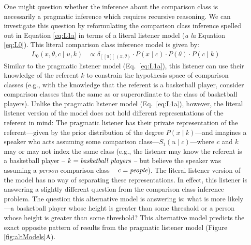 \documentclass[doc]{apa6}
\begin{document}
One might question whether the inference about the comparison class is necessarily a pragmatic inference which requires recursive reasoning. 
We can investigate this question by reformulating the comparison class inference  spelled out in Equation \ref{eq:L1a} in terms of a literal listener model (\emph{a la} Equation \ref{eq:L0}). 
This literal comparison class inference model is given by:
%
  \begin{align}
L_{0}(x, \theta, c \mid u, k) &\propto \delta_{[\![u]\!](x, \theta)} \cdot P(x \mid c)\cdot P(\theta) \cdot P(c \mid k)  \label{eq:L0alt}
\end{align}
%
Similar to the pragmatic listener model (Eq.~\ref{eq:L1a}), this listener can use their knowledge of the referent $k$ to constrain the hypothesis space of comparison classes (e.g., with the knowledge that the referent is a basketball player, consider comparison classes that the same as or superordinate to the class of basketball players).
Unlike the pragmatic listener model (Eq.~\ref{eq:L1a}), however, the literal listener version of the model does not hold different representations of the referent in mind: The pragmatic listener has their private representation of the referent---given by the prior distribution of the degree $P(x \mid k)$---and imagines a speaker who acts assuming some comparison class---$S_1(u \mid c)$---where $c$ and $k$ may or may not index the same class (e.g., the listener may know the referent is a basketball player -- $k = \emph{basketball players}$ -- but believe the speaker was assuming a \emph{person} comparison class -- $c = \emph{people}$).
The literal listener version of the model has no way of separating these representations.
In effect, this listener is answering a slightly different question from the comparison class inference problem. The question this alternative model is answering is: what is more likely---a basketball player whose height is greater than some threshold or a person whose height is greater than some threshold? 
This alternative model predicts the exact opposite pattern of results from the pragmatic listener model (Figure \ref{fig:altModels}A). 
\end{document}
